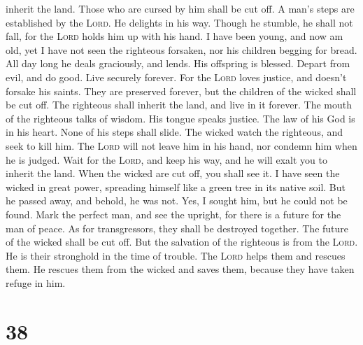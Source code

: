inherit the land. Those who are cursed by him shall be cut off.
 A man's steps are established by the \textsc{Lord}. He
delights in his way.  Though he stumble, he shall not
fall, for the \textsc{Lord} holds him up with his hand. 
I have been young, and now am old, yet I have not seen the righteous
forsaken, nor his children begging for bread.  All day
long he deals graciously, and lends. His offspring is blessed.
 Depart from evil, and do good. Live securely forever.
 For the \textsc{Lord} loves justice, and doesn't forsake
his saints. They are preserved forever, but the children of the wicked
shall be cut off.  The righteous shall inherit the land,
and live in it forever.  The mouth of the righteous talks
of wisdom. His tongue speaks justice.  The law of his God
is in his heart. None of his steps shall slide.  The
wicked watch the righteous, and seek to kill him.  The
\textsc{Lord} will not leave him in his hand, nor condemn him when he is
judged.  Wait for the \textsc{Lord}, and keep his way,
and he will exalt you to inherit the land. When the wicked are cut off,
you shall see it.  I have seen the wicked in great power,
spreading himself like a green tree in its native soil. 
But he passed away, and behold, he was not. Yes, I sought him, but he
could not be found.  Mark the perfect man, and see the
upright, for there is a future for the man of peace.  As
for transgressors, they shall be destroyed together. The future of the
wicked shall be cut off.  But the salvation of the
righteous is from the \textsc{Lord}. He is their stronghold in the time
of trouble.  The \textsc{Lord} helps them and rescues
them. He rescues them from the wicked and saves them, because they have
taken refuge in him.

\hypertarget{section-37}{%
\section{38}\label{section-37}}


